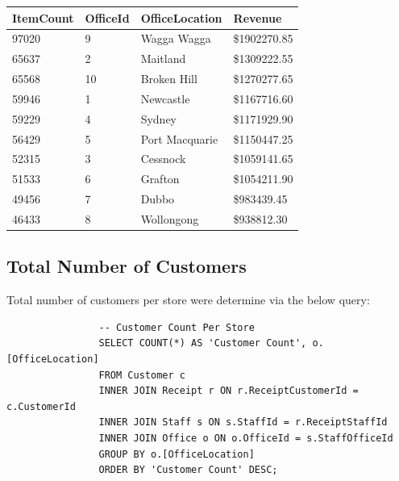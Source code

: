 \documentclass{article}
\begin{document}
                \begin{table}[H]
                    \centering
                    \begin{tabular}{|l|l|l|l|}
                    \hline
                    ItemCount & OfficeId & OfficeLocation & Revenue         \\ \hline
                    97020     & 9        & Wagga Wagga    & \$1902270.85 \\ \hline
                    65637     & 2        & Maitland       & \$1309222.55 \\ \hline
                    65568     & 10       & Broken Hill    & \$1270277.65 \\ \hline
                    59946     & 1        & Newcastle      & \$1167716.60 \\ \hline
                    59229     & 4        & Sydney         & \$1171929.90 \\ \hline
                    56429     & 5        & Port Macquarie & \$1150447.25 \\ \hline
                    52315     & 3        & Cessnock       & \$1059141.65 \\ \hline
                    51533     & 6        & Grafton        & \$1054211.90 \\ \hline
                    49456     & 7        & Dubbo          & \$983439.45  \\ \hline
                    46433     & 8        & Wollongong     & \$938812.30  \\ \hline
                    \end{tabular}
                    \end{table}

            \subsection{Total Number of Customers}
                
            Total number of customers per store were determine via the below query:

            \begin{lstlisting}
                -- Customer Count Per Store
                SELECT COUNT(*) AS 'Customer Count', o.[OfficeLocation]
                FROM Customer c
                INNER JOIN Receipt r ON r.ReceiptCustomerId = c.CustomerId
                INNER JOIN Staff s ON s.StaffId = r.ReceiptStaffId
                INNER JOIN Office o ON o.OfficeId = s.StaffOfficeId
                GROUP BY o.[OfficeLocation]
                ORDER BY 'Customer Count' DESC;
            \end{lstlisting}
\end{document}
